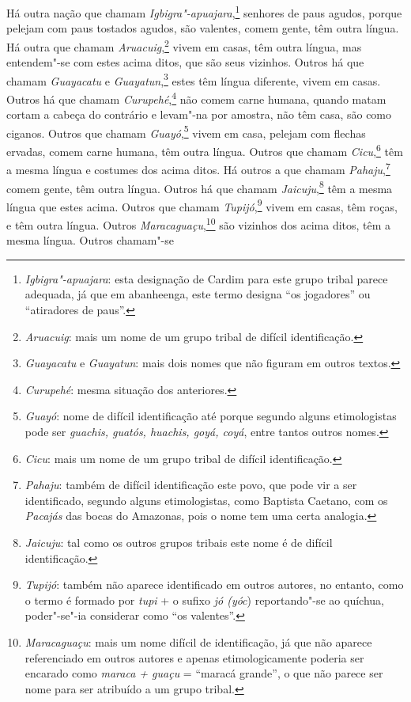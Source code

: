 \begin{linenumbers}
 Há outra nação que chamam \textit{Igbigra"-apuajara},\footnote{ \textit{Igbigra"-apuajara}: 
esta designação de Cardim para este grupo
tribal parece adequada, já que em abanheenga, este termo designa ``os
jogadores'' ou ``atiradores de paus''.} senhores de
paus agudos, porque pelejam com paus tostados agudos, são valentes,
comem gente, têm outra língua. Há outra que chamam 
\textit{Aruacuig},\footnote{ \textit{Aruacuig}: mais um nome de um grupo tribal de
difícil identificação.} vivem em casas, têm outra língua, mas
entendem"-se com estes acima ditos, que são seus vizinhos. Outros há que
chamam \textit{Guayacatu} e \textit{Guayatun},\footnote{ \textit{Guayacatu} 
e \textit{Guayatun}: mais dois nomes que não
figuram em outros textos.} estes têm língua diferente, vivem
em casas. Outros há que chamam \textit{Curupehé},\footnote{ \textit{Curupehé}: 
mesma situação dos anteriores.} não comem
carne humana, quando matam cortam a cabeça do contrário e levam"-na por
amostra, não têm casa, são como ciganos. Outros que chamam
\textit{Guayó},\footnote{ \textit{Guayó}: nome de difícil
identificação até porque segundo alguns etimologistas pode ser
\textit{guachis, guatós, huachis, goyá, coyá}, entre tantos outros
nomes.} vivem em casa, pelejam com flechas ervadas, comem
carne humana, têm outra língua. Outros que chamam \textit{Cicu},\footnote{ \textit{Cicu}: 
mais um nome de um grupo tribal de difícil 
identificação.} têm a mesma língua e costumes dos acima ditos.
Há outros a que chamam \textit{Pahaju},\footnote{ \textit{Pahaju}: 
também de difícil identificação este povo, que pode vir a ser
identificado, segundo alguns etimologistas, como Baptista Caetano, com
os \textit{Pacajás} das bocas do Amazonas, pois o nome tem uma certa
analogia.} comem gente, têm outra língua. Outros há que chamam
\textit{Jaicuju},\footnote{ \textit{Jaicuju}: tal como os outros
grupos tribais este nome é de difícil identificação.} têm a
mesma língua que estes acima. Outros que chamam 
\textit{Tupijó},\footnote{ \textit{Tupijó}: também não aparece identificado em outros
autores, no entanto, como o termo é formado por \textit{tupi} + o
sufixo \textit{jó (yóc}) reportando"-se ao quíchua, poder"-se"-ia
considerar como ``os valentes''.} vivem em casas, têm roças, e
têm outra língua. Outros \textit{Maracaguaçu},\footnote{ \textit{Maracaguaçu}: 
mais um nome difícil de identificação, já que não
aparece referenciado em outros autores e apenas etimologicamente
poderia ser encarado como \textit{maraca + guaçu} = ``maracá grande'', o
que não parece ser nome para ser atribuído a um grupo tribal.} 
são vizinhos dos acima ditos, têm a mesma língua. Outros chamam"-se

\end{linenumbers}
